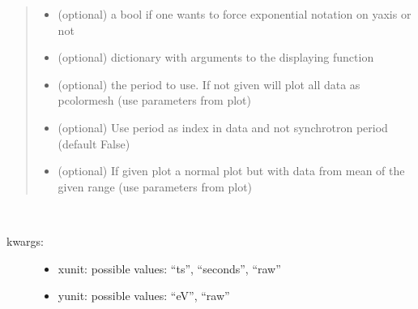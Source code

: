 \documentclass[letterpaper,10pt,openany,oneside,english]{sphinxmanual}
\begin{document}
\begin{fulllineitems}
\begin{fulllineitems}
\begin{quote}
\begin{description}
\begin{itemize}
\item {} 
 \textendash{} (optional) a bool if one wants to force exponential notation on yaxis or not

\item {} 
 \textendash{} (optional) dictionary with arguments to the displaying function

\item {} 
 \textendash{} (optional) the period to use. If not given will plot all data as pcolormesh (use parameters from plot)

\item {} 
 \textendash{} (optional) Use period as index in data and not synchrotron period (default False)

\item {} 
 \textendash{} (optional) If given plot a normal plot but with data from mean of the given range (use parameters from plot)

\end{itemize}

\end{description}\end{quote}

\end{fulllineitems}


\begin{fulllineitems}
\label{\detokenize{plots:plots.SimplePlotter.energy_spread}}~\begin{description}
\item[{kwargs:  }] \leavevmode\begin{itemize}
\item {} 
xunit: possible values: “ts”, “seconds”, “raw”

\item {} 
yunit: possible values: “eV”, “raw”

\end{itemize}

\end{description}

\end{fulllineitems}



\end{fulllineitems}
\end{document}
